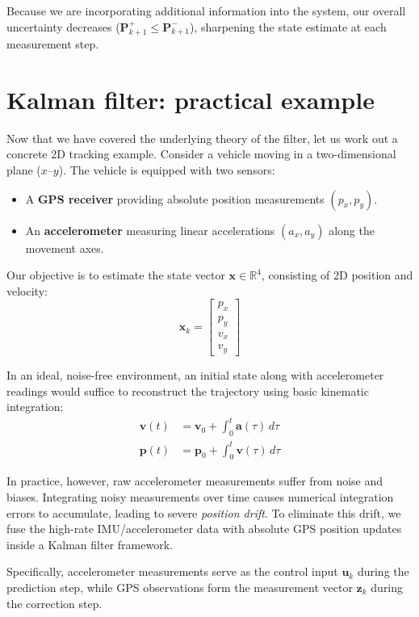 \documentclass{article}
\begin{document}
	Because we are incorporating additional information into the system, our overall uncertainty decreases ($\mathbf{P}_{k+1}^+ \le \mathbf{P}_{k+1}^-$), sharpening the state estimate at each measurement step.
	
	\section{Kalman filter: practical example}
	Now that we have covered the underlying theory of the filter, let us work out a concrete 2D tracking example. Consider a vehicle moving in a two-dimensional plane ($x\text{--}y$). The vehicle is equipped with two sensors:
	\begin{itemize}
		\item A \textbf{GPS receiver} providing absolute position measurements $(p_x, p_y)$.
		\item An \textbf{accelerometer} measuring linear accelerations $(a_x, a_y)$ along the movement axes.
	\end{itemize}
	
	Our objective is to estimate the state vector $\mathbf{x} \in \mathbb{R}^4$, consisting of 2D position and velocity:
	\begin{equation}
		\mathbf{x}_k = 
		\begin{bmatrix}
			p_x \\
			p_y \\
			v_x \\
			v_y
		\end{bmatrix}
	\end{equation}
	
	In an ideal, noise-free environment, an initial state along with accelerometer readings would suffice to reconstruct the trajectory using basic kinematic integration:
	\begin{align*}
		\mathbf{v}(t) &= \mathbf{v}_0 + \int_{0}^{t} \mathbf{a}(\tau) \, d\tau \\
		\mathbf{p}(t) &= \mathbf{p}_0 + \int_{0}^{t} \mathbf{v}(\tau) \, d\tau
	\end{align*}
	
	In practice, however, raw accelerometer measurements suffer from noise and biases. Integrating noisy measurements over time causes numerical integration errors to accumulate, leading to severe \textit{position drift}. To eliminate this drift, we fuse the high-rate IMU/accelerometer data with absolute GPS position updates inside a Kalman filter framework. 
	
	Specifically, accelerometer measurements serve as the control input $\mathbf{u}_k$ during the prediction step, while GPS observations form the measurement vector $\mathbf{z}_k$ during the correction step.
	
\end{document}
